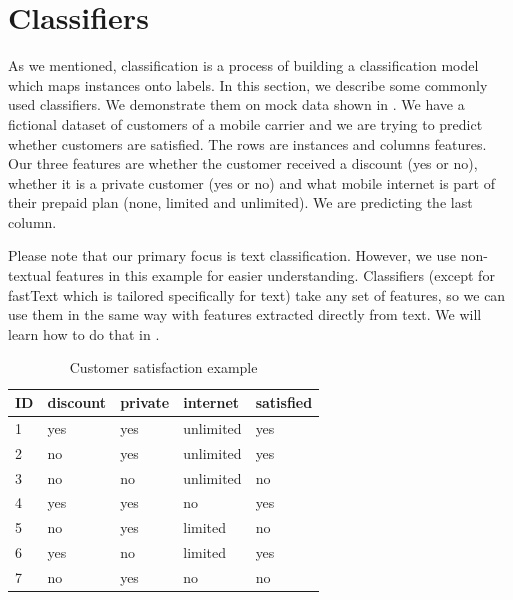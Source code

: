 

\section{Classifiers}
\label{chap:clscon}

As we mentioned, classification is a process of building a classification model which maps
instances onto labels.
In this section, we describe some commonly used classifiers.
We demonstrate them on mock data shown in .
We have a fictional dataset of customers of a mobile carrier and
we are trying to predict whether customers are satisfied.
The rows are instances and columns features.
Our three features are 
whether the customer received a discount (yes or no), whether it is a private customer (yes or no)
and what mobile internet is part of their prepaid plan (none, limited and unlimited).
We are predicting the last column.

Please note that our primary focus is text classification.
However, we use non-textual features in this example for easier understanding.
Classifiers (except for fastText which is tailored specifically for text) take any set of features,
so we can use them in the same way with features extracted directly from text.
We will learn how to do that in .

\begin{table}[h!]

\centering
\begin{tabular}{lllll}
\toprule
\textbf{ID} & \textbf{discount} & \textbf{private} & \textbf{internet} \hspace{1.cm} & \textbf{satisfied} \\
\midrule
1 & yes & yes & unlimited & yes \\
2 & no & yes & unlimited & yes \\
3 & no & no & unlimited & no \\
4 & yes & yes & no & yes \\
5 & no & yes & limited & no \\
6 & yes & no & limited & yes \\
7 & no & yes & no & no \\
\bottomrule
\end{tabular}

\caption{Customer satisfaction example}\label{tab:custsatis}
\end{table}






